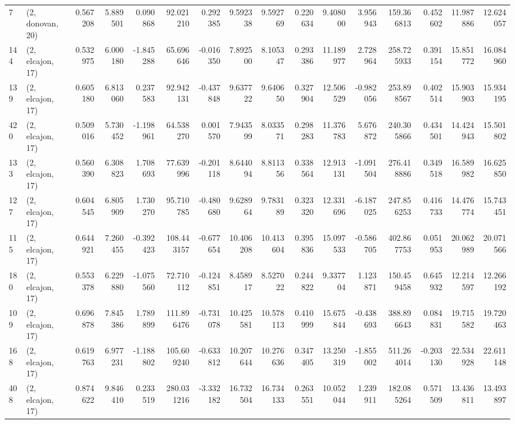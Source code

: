 \begin{tabular}{llrrrrrrrrrrrrrr}
7   &  (2, donovan, 20) &   0.567208 &   5.889501 &   0.090868 &    92.021210 &   0.292385 &   9.592338 &   9.592769 &  0.220634 &   9.408000 &   3.956943 &   159.366813 &  0.452602 &  11.987886 &  12.624057 \\
144 &  (2, elcajon, 17) &   0.532975 &   6.000180 &  -1.845288 &    65.696646 &  -0.016350 &   7.892500 &   8.105347 &  0.293386 &  11.189977 &   2.728964 &   258.725933 &  0.391154 &  15.851772 &  16.084960 \\
139 &  (2, elcajon, 17) &   0.605180 &   6.813060 &   0.237583 &    92.942131 &  -0.437848 &   9.637722 &   9.640650 &  0.327904 &  12.506529 &  -0.982056 &   253.898567 &  0.402514 &  15.903903 &  15.934195 \\
420 &  (2, elcajon, 17) &   0.509016 &   5.730452 &  -1.198961 &    64.538270 &   0.001570 &   7.943599 &   8.033571 &  0.298283 &  11.376783 &   5.676872 &   240.305866 &  0.434501 &  14.424943 &  15.501802 \\
133 &  (2, elcajon, 17) &   0.560390 &   6.308823 &   1.708693 &    77.639996 &  -0.201118 &   8.644094 &   8.811356 &  0.338564 &  12.913131 &  -1.091504 &   276.418886 &  0.349518 &  16.589982 &  16.625850 \\
127 &  (2, elcajon, 17) &   0.604545 &   6.805909 &   1.730270 &    95.710785 &  -0.480680 &   9.628964 &   9.783189 &  0.323320 &  12.331696 &  -6.187025 &   247.856253 &  0.416733 &  14.476774 &  15.743451 \\
115 &  (2, elcajon, 17) &   0.644921 &   7.260455 &  -0.392423 &   108.443157 &  -0.677654 &  10.406208 &  10.413604 &  0.395836 &  15.097533 &  -0.586705 &   402.867753 &  0.051953 &  20.062989 &  20.071566 \\
180 &  (2, elcajon, 17) &   0.553378 &   6.229880 &  -1.075560 &    72.710112 &  -0.124851 &   8.458917 &   8.527022 &  0.244822 &   9.337704 &   1.123871 &   150.459458 &  0.645932 &  12.214597 &  12.266192 \\
109 &  (2, elcajon, 17) &   0.696878 &   7.845386 &   1.789899 &   111.896476 &  -0.731078 &  10.425581 &  10.578113 &  0.410999 &  15.675844 &  -0.438693 &   388.896643 &  0.084831 &  19.715582 &  19.720463 \\
168 &  (2, elcajon, 17) &   0.619763 &   6.977231 &  -1.188802 &   105.609240 &  -0.633812 &  10.207644 &  10.276636 &  0.347405 &  13.250319 &  -1.855002 &   511.264014 & -0.203130 &  22.534928 &  22.611148 \\
408 &  (2, elcajon, 17) &   0.874622 &   9.846410 &   0.233519 &   280.031216 &  -3.332182 &  16.732504 &  16.734133 &  0.263551 &  10.052044 &   1.239911 &   182.085264 &  0.571509 &  13.436811 &  13.493897 \\

\end{tabular}
